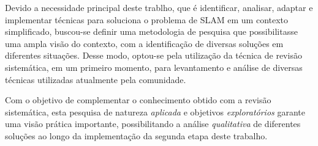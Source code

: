 	Devido a necessidade principal deste trablho, que é identificar, analisar, adaptar e implementar técnicas para soluciona o problema de SLAM em um contexto simplificado, buscou-se definir uma metodologia de pesquisa que possibilitasse uma ampla visão do contexto, com a identificação de diversas soluções em diferentes situações. Desse modo, optou-se pela utilização da técnica de revisão sistemática, em um primeiro momento, para levantamento e análise de diversas técnicas utilizadas atualmente pela comunidade.

	Com o objetivo de complementar o conhecimento obtido com a revisão sistemática, esta pesquisa de natureza \textit{aplicada} e objetivos \textit{exploratórios} garante uma visão prática importante, possibilitando a análise \textit{qualitativa} de diferentes soluções ao longo da implementação da segunda etapa deste trabalho.

